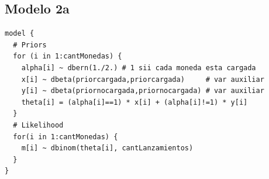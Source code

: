 \documentclass[a4paper]{article}
\begin{document}
\subsection{Modelo 2a}

\begin{lstlisting} 
model { 
  # Priors 
  for (i in 1:cantMonedas) { 
    alpha[i] ~ dbern(1./2.) # 1 sii cada moneda esta cargada 
    x[i] ~ dbeta(priorcargada,priorcargada)     # var auxiliar 
    y[i] ~ dbeta(priornocargada,priornocargada) # var auxiliar 
    theta[i] = (alpha[i]==1) * x[i] + (alpha[i]!=1) * y[i] 
  } 
  # Likelihood 
  for(i in 1:cantMonedas) {
    m[i] ~ dbinom(theta[i], cantLanzamientos)
  } 
} 
\end{lstlisting} 

%
%
% 
%
\end{document}
